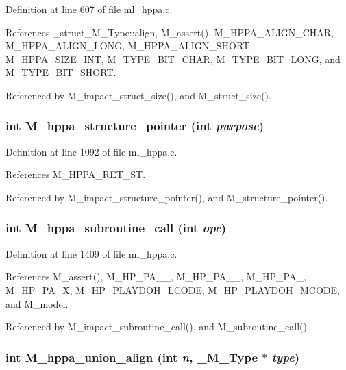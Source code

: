 Definition at line 607 of file ml\_\-hppa.c.

References \_\-struct\_\-M\_\-Type::align, M\_\-assert(), M\_\-HPPA\_\-ALIGN\_\-CHAR, M\_\-HPPA\_\-ALIGN\_\-LONG, M\_\-HPPA\_\-ALIGN\_\-SHORT, M\_\-HPPA\_\-SIZE\_\-INT, M\_\-TYPE\_\-BIT\_\-CHAR, M\_\-TYPE\_\-BIT\_\-LONG, and M\_\-TYPE\_\-BIT\_\-SHORT.

Referenced by M\_\-impact\_\-struct\_\-size(), and M\_\-struct\_\-size().
\subsubsection{\setlength{\rightskip}{0pt plus 5cm}int M\_\-hppa\_\-structure\_\-pointer (int {\em purpose})}\label{ml__hppa_8c_6f4b575dbcf3324e01b0b942b47b5858}




Definition at line 1092 of file ml\_\-hppa.c.

References M\_\-HPPA\_\-RET\_\-ST.

Referenced by M\_\-impact\_\-structure\_\-pointer(), and M\_\-structure\_\-pointer().
\subsubsection{\setlength{\rightskip}{0pt plus 5cm}int M\_\-hppa\_\-subroutine\_\-call (int {\em opc})}\label{ml__hppa_8c_ef4b7cd187d6fe04d3b682be887b3eb1}




Definition at line 1409 of file ml\_\-hppa.c.

References M\_\-assert(), M\_\-HP\_\-PA\_\_, M\_\-HP\_\-PA\_\_, M\_\-HP\_\-PA\_, M\_\-HP\_\-PA\_\-X, M\_\-HP\_\-PLAYDOH\_\-LCODE, M\_\-HP\_\-PLAYDOH\_\-MCODE, and M\_\-model.

Referenced by M\_\-impact\_\-subroutine\_\-call(), and M\_\-subroutine\_\-call().
\subsubsection{\setlength{\rightskip}{0pt plus 5cm}int M\_\-hppa\_\-union\_\-align (int {\em n}, \bf{\_\-M\_\-Type} $\ast$ {\em type})}\label{ml__hppa_8c_de73701883cf19da60efc9b25e2781da}




